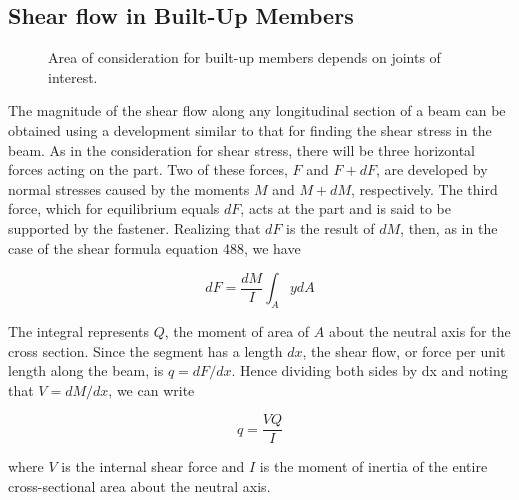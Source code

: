 \documentclass[
10pt,
a4paper,
openany,
svgnames,
]{book} %
\begin{document}
\subsection{Shear flow in Built-Up Members}

\begin{figure}[h]
  \centering
  \caption{Area of consideration for built-up members depends on joints of interest.}
  \end{figure}

The magnitude of the shear flow along any longitudinal section of a beam can be obtained using a development similar to that for finding the shear stress in the beam. As in the consideration for shear stress, there will be three horizontal forces acting on the part. Two of these forces, $F$ and $F + dF$, are developed by normal stresses caused by the moments $M$ and $M + dM$, respectively. The third force, which for equilibrium equals $dF$, acts at the part and is said to be supported by the fastener.  Realizing that $dF$ is the result of $dM$, then, as in the case of the shear formula equation 488, we have

\begin{equation*}
  dF = \frac{dM}{I}\int_A ydA
\end{equation*}

The integral represents $Q$, the moment of area of $A$ about the neutral axis for the cross section. Since the segment has a length $dx$, the shear flow, or force per unit length along the beam, is $q = dF/dx$. Hence dividing both sides by dx and noting that $V = dM/dx$, we can write

\[q = \frac{VQ}{I}\]

where $V$ is the internal shear force and $I$ is the moment of inertia of the entire cross-sectional area about the neutral axis.
\end{document}
